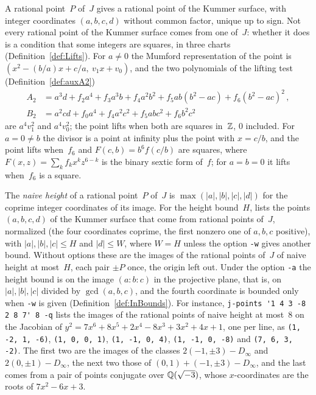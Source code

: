 A rational point~$P$ of~$J$ gives a rational point of the Kummer surface, with integer coordinates
$(a, b, c, d)$ without common factor, unique up to sign. Not every rational point of the Kummer
surface comes from one of~$J$: whether it does is a condition that some integers are squares, in
three charts (Definition~\ref{def:Lifts}). For $a \ne 0$ the Mumford representation of the point is
$(x^2 - (b/a) x + c/a,\ v_1 x + v_0)$, and the two polynomials of the lifting test
(Definition~\ref{def:auxA2})
\begin{align*}
  A_2 &= a^3 d + f_2 a^4 + f_3 a^3 b + f_4 a^2 b^2 + f_5 a b (b^2 - a c) + f_6 (b^2 - a c)^2\,, \\
  B_2 &= a^2 c d + f_0 a^4 + f_4 a^2 c^2 + f_5 a b c^2 + f_6 b^2 c^2
\end{align*}
are $a^4 v_1^2$ and $a^4 v_0^2$; the point lifts when both are squares in~$\mathbb{Z}$, $0$ included. For
$a = 0 \ne b$ the divisor is a point at infinity plus the point with $x = c/b$, and the point lifts
when~$f_6$ and $F(c, b) = b^6 f(c/b)$ are squares, where $F(x, z) = \sum_k f_k x^k z^{6-k}$ is the
binary sextic form of~$f$; for $a = b = 0$ it lifts when~$f_6$ is a square.

The \emph{naive height} of a rational point~$P$ of~$J$ is $\max(|a|, |b|, |c|, |d|)$ for the coprime
integer coordinates of its image. For the height bound~$H$, \jpoints{} lists the points $(a, b, c,
d)$ of the Kummer surface that come from rational points of~$J$, normalized (the four coordinates
coprime, the first nonzero one of $a, b, c$ positive), with $|a|, |b|, |c| \le H$ and $|d| \le W$,
where $W = H$ unless the option \verb|-w| gives another bound. Without options these are the images
of the rational points of~$J$ of naive height at most~$H$, each pair $\pm P$ once, the origin left
out. Under the option \verb|-a| the height bound is on the image $(a : b : c)$ in the projective
plane, that is, on $|a|, |b|, |c|$ divided by $\gcd(a, b, c)$, and the fourth coordinate is bounded
only when \verb|-w| is given (Definition~\ref{def:InBounds}). For instance,
\verb|j-points '1 4 3 -8 2 8 7' 8 -q| lists the images of the rational points of naive height at
most~$8$ on the Jacobian of $y^2 = 7x^6 + 8x^5 + 2x^4 - 8x^3 + 3x^2 + 4x + 1$, one per line, as
\verb|(1, -2, 1, -6)|, \verb|(1, 0, 0, 1)|, \verb|(1, -1, 0, 4)|, \verb|(1, -1, 0, -8)| and
\verb|(7, 6, 3, -2)|. The first two are the images of the classes $2 (-1, \pm 3) - D_\infty$ and $2
(0, \pm 1) - D_\infty$, the next two those of $(0, 1) + (-1, \pm 3) - D_\infty$, and the last comes
from a pair of points conjugate over $\mathbb{Q}(\sqrt{-3})$, whose $x$-coordinates are the roots of $7x^2
- 6x + 3$.

